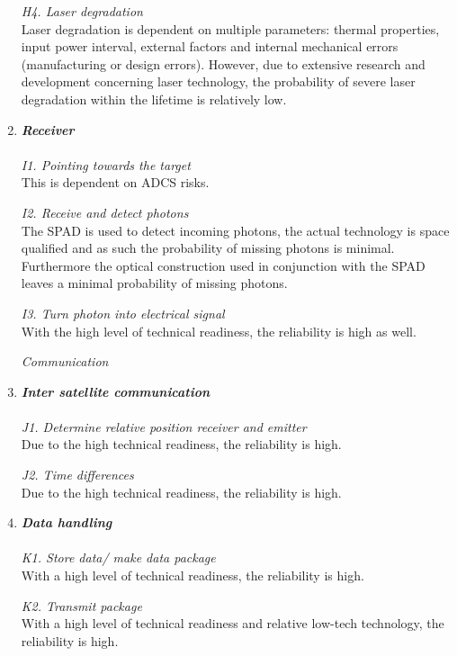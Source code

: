\begin{enumerate}[A]
\textit{H4. Laser degradation}\\
Laser degradation is dependent on multiple parameters: thermal properties, input power interval, external factors and internal mechanical errors (manufacturing or design errors). However, due to extensive research and development concerning laser technology, the probability of severe laser degradation within the lifetime is relatively low. 

	\item\textbf{\textit{Receiver}} \\\\
\textit{I1. Pointing towards the target} \\
This is dependent on ADCS risks.

\textit{I2. Receive and detect photons}\\ 
The \ac{SPAD} is used to detect incoming photons, the actual technology is space qualified and as such the probability of missing photons is minimal. Furthermore the optical construction used in conjunction with the \acs{SPAD} leaves a minimal probability of missing photons. 

\textit{I3. Turn photon into electrical signal}\\ 
With the high level of technical readiness, the reliability is high as well.

\begin{description}
\item[\textit{Communication}]
\end{description}
	\item\textbf{\textit{Inter satellite communication}} \\\\
\textit{J1. Determine relative position receiver and emitter}\\ 
Due to the high technical readiness, the reliability is high.

\textit{J2. Time differences}\\ 
Due to the high technical readiness, the reliability is high.

	\item\textbf{\textit{Data handling}} \\\\
\textit{K1. Store data/ make data package}\\ 
With a high level of technical readiness, the reliability is high.

\textit{K2. Transmit package}\\ 
With a high level of technical readiness and relative low-tech technology, the reliability is high.


\end{enumerate}
